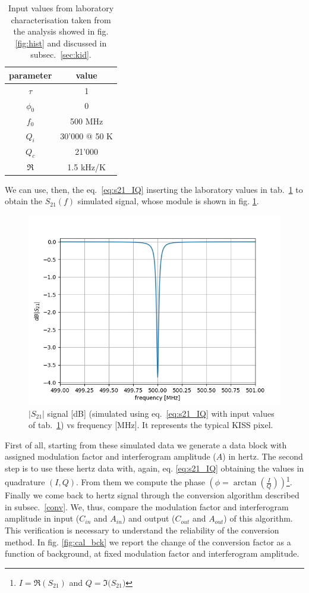 \documentclass[twocolumn,traditabstract]{aa}\\
\begin{document}
\begin{table}[htf]
	\footnotesize
	\centering
	\caption{Input values from laboratory characterisation taken from the analysis showed in fig. \ref{fig:hist} and discussed in subsec.~\ref{sec:kid}.}
	\begin{tabular}{cc}
		\toprule
		\textbf{parameter} & \textbf{value} \\
		\toprule
		$\tau$ & 1 \\ 
		\midrule 
		$\phi_0$ & 0 \\
		\midrule
		$f_0$ & 500 MHz \\  
		\midrule 
		$Q_i$ & 30'000 @ 50 K \\ 
		\midrule 
		$Q_c$ & 21'000 \\ 
		\midrule 
		$\mathfrak{R}$  & 1.5 kHz/K \\ 
		\bottomrule
	\end{tabular}
	\label{tab:s21_values}
\end{table}

\noindent We can use, then, the eq.~\ref{eq:s21_IQ} inserting the laboratory values in tab.~\ref{tab:s21_values} to obtain the $S_{21}(f)$ simulated signal, whose module is shown in fig. \ref{fig:s21_simu}.

\begin{figure}[htf]
	\centering
	\includegraphics[width=.5\textwidth]{3.acqui/resonance.png}
	\caption{$\left|S_{21} \right|$ signal [dB] (simulated using eq.~\ref{eq:s21_IQ} with input values of tab.~\ref{tab:s21_values}) vs frequency [MHz]. It represents the typical KISS pixel.}
	\label{fig:s21_simu}
\end{figure}

First of all, starting from these simulated data we generate a data block with assigned modulation factor and interferogram amplitude ($A$) in hertz. The second step is to use these hertz data with, again, eq. \ref{eq:s21_IQ} obtaining the values in quadrature $(I,Q)$. From them we compute the phase $\left( \phi=\arctan\left(\frac{I}{Q}\right) \right)$\footnote{ $I = \Re(S_{21})$ and $Q = \Im({S_{21})}$ }. Finally we come back to hertz signal through the conversion algorithm described in subsec.~\ref{conv}. We, thus, compare the modulation factor and interferogram amplitude in input ($C_{in}$ and $A_{in}$) and output ($C_{out}$ and $A_{out}$) of this algorithm. This verification is necessary to understand the reliability of the conversion method. In fig. \ref{fig:cal_bck} we report the change of the conversion factor as a function of background, at fixed modulation factor and interferogram amplitude.
\end{document}
